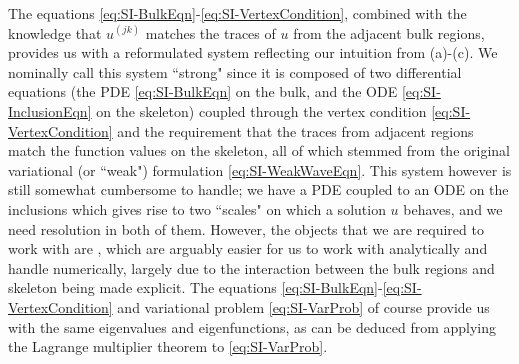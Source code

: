 The equations \eqref{eq:SI-BulkEqn}-\eqref{eq:SI-VertexCondition}, combined with the knowledge that $u^{(jk)}$ matches the traces of $u$ from the adjacent bulk regions, provides us with a reformulated system reflecting our intuition from (a)-(c).
We nominally call this system ``strong" since it is composed of two differential equations (the PDE \eqref{eq:SI-BulkEqn} on the bulk, and the ODE \eqref{eq:SI-InclusionEqn} on the skeleton) coupled through the vertex condition \eqref{eq:SI-VertexCondition} and the requirement that the traces from adjacent regions match the function values on the skeleton, all of which stemmed from the original variational (or ``weak") formulation \ref{eq:SI-WeakWaveEqn}.
This system however is still somewhat cumbersome to handle; we have a PDE coupled to an ODE on the inclusions which gives rise to two ``scales" on which a solution $u$ behaves, and we need resolution in both of them.
However, the objects that we are required to work with are , which are arguably easier for us to work with analytically and handle numerically, largely due to the interaction between the bulk regions and skeleton being made explicit.
The equations \eqref{eq:SI-BulkEqn}-\eqref{eq:SI-VertexCondition} and variational problem \eqref{eq:SI-VarProb} of course provide us with the same eigenvalues and eigenfunctions, as can be deduced from applying the Lagrange multiplier theorem to \eqref{eq:SI-VarProb}. 